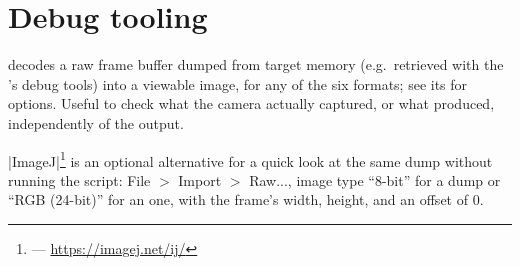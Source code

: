 \section{Debug tooling}
\label{sec:fpgasteel-simple-forwarding-debug-tooling}

 decodes a raw frame buffer dumped from target memory (e.g.\ retrieved with the  's debug tools) into a viewable image, for any of the six  formats; see its  for options. Useful to check what the camera actually captured, or what  produced, independently of the  output.

|ImageJ|\footnote{ --- \url{https://imagej.net/ij/}} is an optional alternative for a quick look at the same dump without running the script: File $>$ Import $>$ Raw..., image type ``8-bit'' for a  dump or ``RGB (24-bit)'' for an  one, with the frame's width, height, and an offset of 0.



